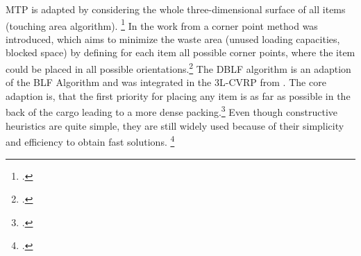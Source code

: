 \gls{MTP} is adapted by considering the whole three-dimensional
surface of all items (touching area algorithm). \footcite[cf.][p. 345]{gendreau_tabu_2006}
In the work from \cite{tao_effective_2015} a corner point method
was introduced, which aims to minimize the waste area (unused loading capacities, blocked space) by
defining for each item all possible corner points, where the item could be placed in all possible
orientations.\footcite[cf.][pp. 130-132]{tao_effective_2015} The \gls{DBLF} algorithm
is an adaption of the \gls{BLF} Algorithm and was integrated in the \gls{3L-CVRP} from \cite{krebs_advanced_2021}.
The core adaption is, that the first priority for placing any item is as far as possible in the back of the cargo
leading to a more dense packing.\footcite[cf.][pp. 8-9]{krebs_axle_2021}
Even though constructive heuristics are quite simple, they are still widely used because of their simplicity and efficiency to obtain fast solutions.
\footcite[cf.][pp. 11--13]{tamke_branch-and-cut_2024}

